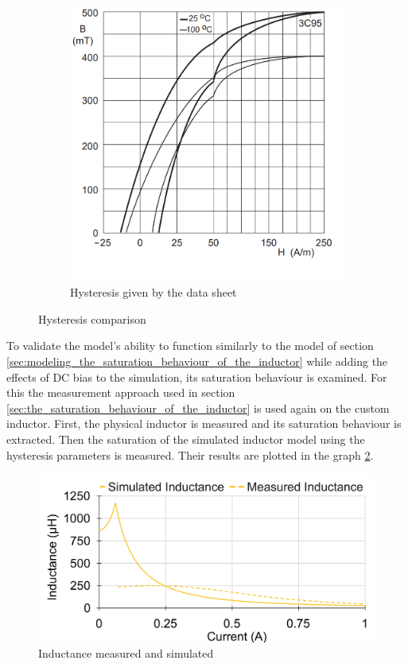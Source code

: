 \begin{figure}[H]
\begin{subfigure}[b]{0.49\textwidth}
        \includegraphics[width=\textwidth]{Bilder/Kapitel3/DataSheet_Hysteresis_Curve_2.png}
        \caption{Hysteresis given by the data sheet \cite{ferroxcubeProductSpecificationsCore2016}}
    \end{subfigure}
    \caption{Hysteresis comparison}
    \label{fig:hysteresis_comparison}							
\end{figure}
To validate the model's ability to function similarly to the model of section \ref{sec:modeling_the_saturation_behaviour_of_the_inductor} while adding the effects of \ac{DC} bias to the simulation, its saturation behaviour is examined. For this the measurement approach used in section \ref{sec:the_saturation_behaviour_of_the_inductor} is used again on the custom inductor. First, the physical inductor is measured and its saturation behaviour is extracted. Then the saturation of the simulated inductor model using the hysteresis parameters is measured. Their results are plotted in the graph \ref{fig:inductance_measured_and_simulatd}. 
\begin{figure}[H]
    \centering
    \includegraphics[width=.75\linewidth]{Bilder/Kapitel3/Saturation_Measured_and_Simulated_Hyst.pdf}
    \caption{Inductance measured and simulated}
    \label{fig:inductance_measured_and_simulatd}
\end{figure} 
